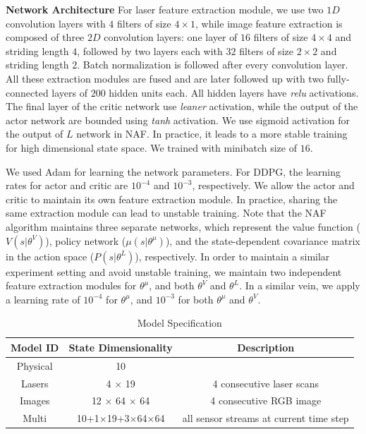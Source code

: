 \documentclass[../thesis.tex]{subfiles}
\begin{document}
\textbf{Network Architecture}
For laser feature extraction module, we use two $1D$ convolution layers with $4$ filters of size $4 \times 1$, while image feature extraction is composed of three $2D$ convolution layers: one layer of $16$ filters of size $4 \times 4$ and striding length $4$, followed by two layers each with $32$ filters of size $2 \times 2 $ and striding length $2$. Batch normalization is followed after every convolution layer. All these extraction modules are fused and are later followed up with two fully-connected layers of $200$ hidden units each. All hidden layers have \emph{relu} activations. The final layer of the critic network use \emph{leaner} activation, while the output of the actor network are bounded using \emph{tanh} activation. We use sigmoid activation for the output of $L$ network in NAF. In practice, it leads to a more stable training for high dimensional state space. We trained with minibatch size of $16$. 

We used Adam \cite{adam} for learning the network parameters. For DDPG, the learning rates for actor and critic are $10^{-4}$ and $10^{-3}$, respectively. We allow the actor and critic to maintain its own feature extraction module. In practice, sharing the same extraction module can lead to unstable training. Note that the NAF algorithm maintains three separate networks, which represent the value function ($V(s|\theta^V)$), policy network ($\mu(s|\theta^\mu)$), and the state-dependent covariance matrix in the action space ($P(s|\theta^L)$), respectively. In order to maintain a similar experiment setting and avoid unstable training, we maintain two independent feature extraction modules for $\theta^\mu$, and both $\theta^V$ and $\theta^L$. In a similar vein, we apply a learning rate of $10^{-4}$ for $\theta^\mu$, and $10^{-3}$ for both  $\theta^\mu$ and $\theta^V$. 

\begin{table}[t]
    \vskip 0.1in
    \caption{Model Specification}
    \label{table:model-spec}
    \vskip 0.1in
    \centering
    \begin{small}
    \begin{tabular}{ccc}
    \toprule 
    \centering
    Model ID & State Dimensionality & Description \\ \midrule \midrule
    Physical & 10 & \\
    Lasers & 4 $\times$ 19 & 4 consecutive laser scans \\
    Images & 12 $\times$ 64 $\times$ 64 & 4 consecutive RGB image \\
    Multi  & 10+1$\times$19+3$\times$64$\times$64 & all sensor streams at current time step \\ \toprule
    \end{tabular}
    \end{small}
\end{table}
\end{document}
